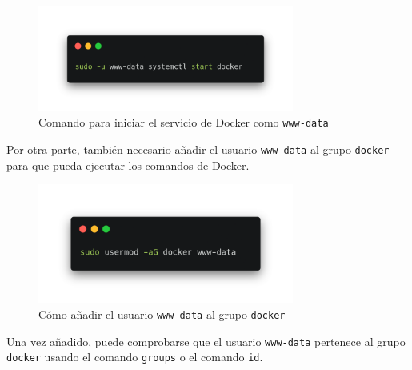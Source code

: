         \begin{figure}[htbp]
            \centering

            \includegraphics[width=0.75\textwidth]{images/Capturas/comandos/systemctl.png}
            \caption{Comando para iniciar el servicio de Docker como \texttt{www-data}}
            \label{fig:servicio-docker}
        \end{figure}

        Por otra parte, también necesario añadir el usuario \texttt{www-data} al grupo \texttt{docker} para que pueda ejecutar los comandos de Docker.

        \begin{figure}[!htbp]
            \centering

            \includegraphics[width=0.75\textwidth]{images/Capturas/comandos/usermod.png}
            \caption{Cómo añadir el usuario \texttt{www-data} al grupo \texttt{docker}}
            \label{fig:usermod}
        \end{figure}

        Una vez añadido, puede comprobarse que el usuario \texttt{www-data} pertenece al grupo \texttt{docker} usando el comando \texttt{groups} o el comando \texttt{id}.

